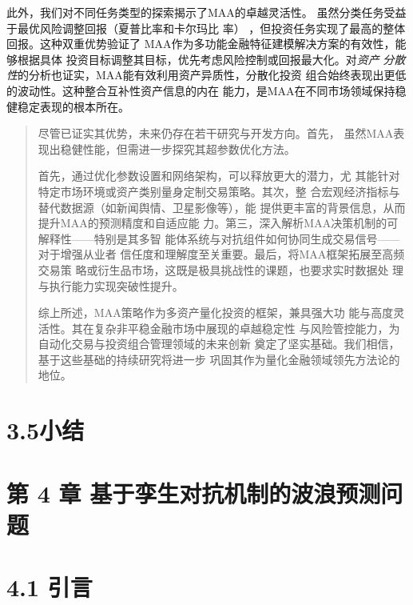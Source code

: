 此外，我们对不同任务类型的探索揭示了MAA的卓越灵活性。
虽然分类任务受益于最优风险调整回报（夏普比率和卡尔玛比 率）
，但投资任务实现了最高的整体回报。这种双重优势验证了
MAA作为多功能金融特征建模解决方案的有效性，能够根据具体
投资目标调整其目标，优先考虑风险控制或回报最大化。对\emph{资产}
\emph{分散性}的分析也证实，MAA能有效利用资产异质性，分散化投资
组合始终表现出更低的波动性。这种整合互补性资产信息的内在
能力，是MAA在不同市场领域保持稳健稳定表现的根本所在。

\begin{quote}
尽管已证实其优势，未来仍存在若干研究与开发方向。首先，
虽然MAA表现出稳健性能，但需进一步探究其超参数优化方法。

首先，通过优化参数设置和网络架构，可以释放更大的潜力，尤
其能针对特定市场环境或资产类别量身定制交易策略。其次，整
合宏观经济指标与替代数据源（如新闻舆情、卫星影像等），能
提供更丰富的背景信息，从而提升MAA的预测精度和自适应能
力。第三，深入解析MAA决策机制的可解释性------特别是其多智
能体系统与对抗组件如何协同生成交易信号------对于增强从业者
信任度和理解度至关重要。最后，将MAA框架拓展至高频交易策
略或衍生品市场，这既是极具挑战性的课题，也要求实时数据处
理与执行能力实现突破性提升。

综上所述，MAA策略作为多资产量化投资的框架，兼具强大功
能与高度灵活性。其在复杂非平稳金融市场中展现的卓越稳定性
与风险管控能力，为自动化交易与投资组合管理领域的未来创新
奠定了坚实基础。我们相信，基于这些基础的持续研究将进一步
巩固其作为量化金融领域领先方法论的地位。
\end{quote}

\section{3.5小结}\label{ux5c0fux7ed3}

\section{第 4 章
基于孪生对抗机制的波浪预测问题}

\section{4.1 引言}

